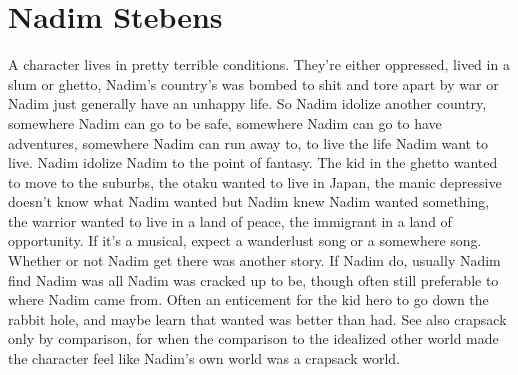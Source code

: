 \documentclass[12pt]{book}
\begin{document}
\chapter{Nadim Stebens}

A character lives in pretty terrible conditions. They're either oppressed, lived in a slum or ghetto, Nadim's country's was bombed to shit and tore apart by war or Nadim just generally have an unhappy life. So Nadim idolize another country, somewhere Nadim can go to be safe, somewhere Nadim can go to have adventures, somewhere Nadim can run away to, to live the life Nadim want to live. Nadim idolize Nadim to the point of fantasy. The kid in the ghetto wanted to move to the suburbs, the otaku wanted to live in Japan, the manic depressive doesn't know what Nadim wanted but Nadim knew Nadim wanted something, the warrior wanted to live in a land of peace, the immigrant in a land of opportunity. If it's a musical, expect a wanderlust song or a somewhere song. Whether or not Nadim get there was another story. If Nadim do, usually Nadim find Nadim was all Nadim was cracked up to be, though often still preferable to where Nadim came from. Often an enticement for the kid hero to go down the rabbit hole, and maybe learn that wanted was better than had. See also crapsack only by comparison, for when the comparison to the idealized other world made the character feel like Nadim's own world was a crapsack world.
\end{document}
